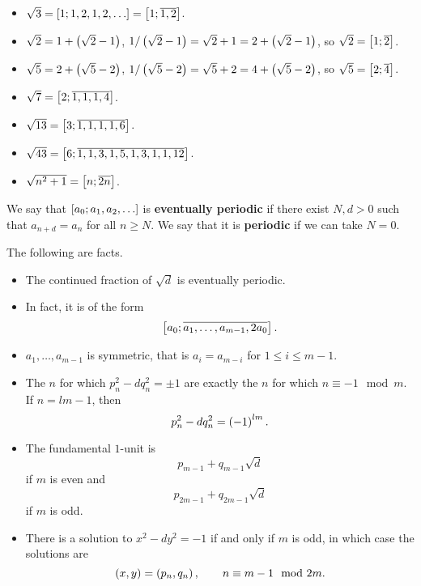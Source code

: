 \begin{example2}
\hfill
\begin{itemize}
\item $ \sqrt{3} = \sb{1; 1, 2, 1, 2, \dots} = \sb{1; \overline{1, 2}} $.
\item $ \sqrt{2} = 1 + \rb{\sqrt{2} - 1} $, $ 1 / \rb{\sqrt{2} - 1} = \sqrt{2} + 1 = 2 + \rb{\sqrt{2} - 1} $, so $ \sqrt{2} = \sb{1; \overline{2}} $.
\item $ \sqrt{5} = 2 + \rb{\sqrt{5} - 2} $, $ 1 / \rb{\sqrt{5} - 2} = \sqrt{5} + 2 = 4 + \rb{\sqrt{5} - 2} $, so $ \sqrt{5} = \sb{2; \overline{4}} $.
\item $ \sqrt{7} = \sb{2; \overline{1, 1, 1, 4}} $.
\item $ \sqrt{13} = \sb{3; \overline{1, 1, 1, 1, 6}} $.
\item $ \sqrt{43} = \sb{6; \overline{1, 1, 3, 1, 5, 1, 3, 1, 1, 12}} $.
\item $ \sqrt{n^2 + 1} = \sb{n; \overline{2n}} $.
\end{itemize}
\end{example2}

\begin{definition}
We say that $ \sb{a_0; a_1, a_2, \dots} $ is \textbf{eventually periodic} if there exist $ N, d > 0 $ such that $ a_{n + d} = a_n $ for all $ n \ge N $. We say that it is \textbf{periodic} if we can take $ N = 0 $.
\end{definition}

\begin{remark1}
The following are facts.
\begin{itemize}
\item The continued fraction of $ \sqrt{d} $ is eventually periodic.
\item In fact, it is of the form
$$ \sb{a_0; \overline{a_1, \dots, a_{m - 1}, 2a_0}}. $$
\item $ a_1, \dots, a_{m - 1} $ is symmetric, that is $ a_i = a_{m - i} $ for $ 1 \le i \le m - 1 $.
\item The $ n $ for which $ p_n^2 - dq_n^2 = \pm 1 $ are exactly the $ n $ for which $ n \equiv -1 \mod m $. If $ n = lm - 1 $, then
$$ p_n^2 - dq_n^2 = \rb{-1}^{lm}. $$
\item The fundamental $ 1 $-unit is
$$ p_{m - 1} + q_{m - 1}\sqrt{d} $$
if $ m $ is even and
$$ p_{2m - 1} + q_{2m - 1}\sqrt{d} $$
if $ m $ is odd.
\item There is a solution to $ x^2 - dy^2 = -1 $ if and only if $ m $ is odd, in which case the solutions are
$$ \rb{x, y} = \rb{p_n, q_n}, \qquad n \equiv m - 1 \mod 2m. $$
\end{itemize}
\end{remark1}

